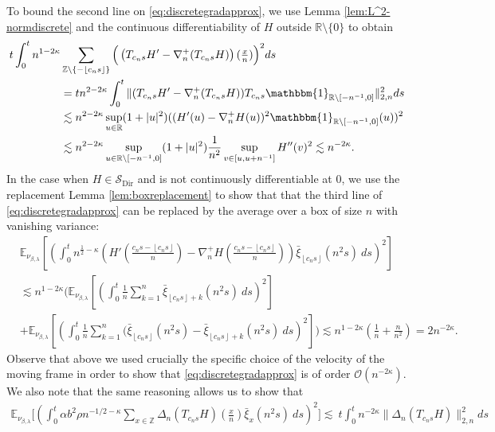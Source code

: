 \documentclass[a4paper, reqno, 12pt]{amsart}
\theoremstyle{plain}
\theoremstyle{definition}
\newcommand{\floor}[1]{\left\lfloor #1 \right\rfloor}
\newcommand{\ee}[1]{\mathbb{E}_{\nu_{\beta,\lambda}}\left[ #1 \right]}
\newcommand{\R}{\mathbb{R}}
\newcommand{\Z}{\mathbb{Z}}
\newcommand{\Sdir}{\mathcal{S}_{\text{Dir}}}
\begin{document}
To bound the  second line on \eqref{eq:discretegradapprox}, we use Lemma \ref{lem:L^2-normdiscrete} and the continuous differentiability of $H$ outside  $\R\setminus\{0 \}$ to obtain 
\begin{align*}
    t \int_0^t  n^{1-2\kappa}&  \sum_{\Z \setminus \{-\floor{c_ns}\}}   \Big(\left(T_{c_n s}H' -   \nabla^+_n(T_{c_n s}H)\right) (\tfrac{x}{n})\Big)^2  ds \\ 
    &= tn^{2-2\kappa}\int_0^t\|(T_{c_n s}H' - \nabla^+_n(T_{c_n s}H))T_{c_ns}\mathbbm{1}_{\R\setminus [-n^{-1},0]}\|_{2,n}^2 ds\\
    &\lesssim n^{2-2\kappa} \sup_{u\in\R}(1+|u|^2)((H'(u) - \nabla^+_nH(u))^2\mathbbm{1}_{\R\setminus[-n^{-1},0]}(u))^2\\
    &\lesssim n^{2-2\kappa} \sup_{u\in\R\setminus[-n^{-1},0]}(1+|u|^2) \frac{1}{n^2} \sup_{v\in[u,u+n^{-1}]}H''(v)^2 \lesssim n^{-2\kappa}.
\end{align*}
In the case when $H\in\Sdir$ and is not continuously differentiable at $0$, we use the replacement Lemma \ref{lem:boxreplacement} to show that that the third line of \eqref{eq:discretegradapprox} can be replaced by the average over a box of size $n$ with vanishing variance:
\begin{align*}
    & \ee{\left(\int_0^t n^{\frac{1}{2} - \kappa} \left(H'\left(\frac{c_ns-\floor{c_ns} }{n}\right) -\nabla^+_n H\left(\frac{c_ns-\floor{c_ns} }{n}\right)\right)\bar \xi_{\floor{c_ns}}(n^2s)\ ds\right)^2} \\
    & \lesssim n^{1-2\kappa} \Bigg(\ee{\left(\int_0^t \frac{1}{n} \sum_{k=1}^n \bar \xi_{\floor{c_n s}+k}(n^2s)\ ds\right)^2} \\
    &+ \ee{\left(\int_0^t \frac{1}{n}\sum_{k=1}^n (\bar\xi_{\floor{c_n s}}(n^2s)-\bar\xi_{\floor{c_n s}+ k}(n^2s)\ ds\right)^2}\Bigg) \lesssim n^{1-2\kappa} \left(\frac{1}{n} +\frac{n}{n^2}\right) =2n^{-2\kappa}.
\end{align*}
Observe that above we used crucially  the specific choice of the velocity of the moving frame in order to show that  \eqref{eq:discretegradapprox} is of order $\mathcal O(n^{-2\kappa})$.
We also note that the same reasoning allows us to show that 
\begin{equation*}
    \begin{split}
\mathbb E_{\nu_{\beta,\lambda}}\Bigg[ \left(\int_0^t \alpha b^2\rho n^{-1/2-\kappa} \sum_{x\in\mathbb{Z}} \Delta_n (T_{c_ns}H)(\tfrac{x}{n}){\bar\xi_x}(n^2s) \ ds \right)^2 \Bigg] 
        \lesssim \   t\int_0^t n^{-2\kappa}\|\Delta_n (T_{c_ns}H) \|_{2,n}^2 ds 
    \end{split}
\end{equation*}
\end{document}
